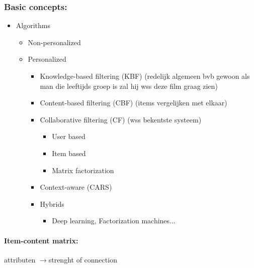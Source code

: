 \documentclass[12pt]{article}
\begin{document}
\subsubsection{Basic concepts:}
\begin{itemize}
    \item Algorithms\begin{itemize}
        \item Non-personalized
        \item Personalized\begin{itemize}
            \item Knowledge-based filtering (KBF) (redelijk algemeen bvb gewoon als man die leeftijds groep is zal hij wss deze film graag zien)
            \item Content-based filtering (CBF) (items vergelijken met elkaar)
            \item Collaborative filtering (CF) (wss bekentste systeem)\begin{itemize}
                \item User based 
                \item Item based 
                \item Matrix factorization 
            \end{itemize}
            \item Context-aware (CARS)
            \item Hybrids\begin{itemize}
                \item Deep learning, Factorization machines...
            \end{itemize}
        \end{itemize}
    \end{itemize}
\end{itemize}
\paragraph{Item-content matrix:}
attributen $\rightarrow$strenght of connection
\end{document}
